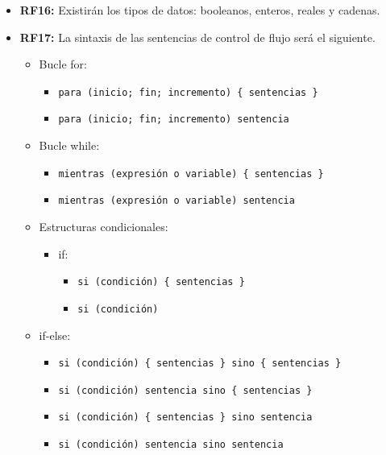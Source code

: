 \begin{itemize}
      \item \textbf{RF16:} Existirán los tipos de datos: booleanos, enteros, reales y cadenas.
      \item \textbf{RF17:} La sintaxis de las sentencias de control de flujo será el siguiente.
        
        \begin{itemize}
        \item Bucle for:
          
          \begin{itemize}
          \item \texttt{para (inicio; fin; incremento) \{ sentencias \}}
          \item \texttt{para (inicio; fin; incremento) sentencia}
          \end{itemize}
          
        \item Bucle while:
          
          \begin{itemize}
          \item \texttt{mientras (expresión o variable) \{ sentencias \}}
          \item \texttt{mientras (expresión o variable) sentencia}
          \end{itemize}
          
        \item Estructuras condicionales:
          
          \begin{itemize}
          \item if:
            
            \begin{itemize}
            \item \texttt{si (condición) \{ sentencias \}}
            \item \texttt{si (condición)}
            \end{itemize}
            
          \end{itemize}
          
        \item if-else:
          
          \begin{itemize}
          \item \texttt{si (condición) \{ sentencias \} sino \{ sentencias \}}
          \item \texttt{si (condición) sentencia sino \{ sentencias \}}
          \item \texttt{si (condición) \{ sentencias \} sino sentencia}
          \item \texttt{si (condición) sentencia sino sentencia}
          \end{itemize}
          

\end{itemize}
\end{itemize}
